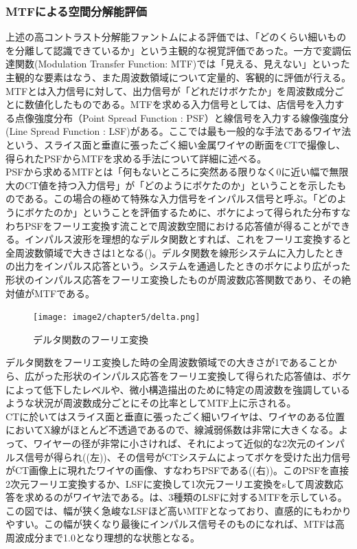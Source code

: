 \subsubsection*{MTFによる空間分解能評価\label{sec:MTF}}
上述の高コントラスト分解能ファントムによる評価では、「どのくらい細いものを分離して認識できているか」という主観的な視覚評価であった。一方で変調伝達関数(Modulation Transfer Function: MTF)では「見える、見えない」といった主観的な要素はなう、また周波数領域について定量的、客観的に評価が行える。MTFとは入力信号に対して、出力信号が「どれだけボケたか」を周波数成分ごとに数値化したものである。MTFを求める入力信号としては、店信号を入力する点像強度分布（Point Spread Function : PSF）と線信号を入力する線像強度分(Line Spread Function : LSF)がある。ここでは最も一般的な手法であるワイヤ法という、スライス面と垂直に張ったごく細い金属ワイヤの断面をCTで撮像し、得られたPSFからMTFを求める手法について詳細に述べる。\\
PSFから求めるMTFとは「何もないところに突然ある限りなく0に近い幅で無限大のCT値を持つ入力信号」が「どのようにボケたのか」ということを示したものである。この場合の極めて特殊な入力信号をインパルス信号と呼ぶ。「どのようにボケたのか」ということを評価するために、ボケによって得られた分布すなわちPSFをフーリエ変換す流ことで周波数空間における応答値が得ることができる。インパルス波形を理想的なデルタ関数とすれば、これをフーリエ変換すると全周波数領域で大きさは1となる()。デルタ関数を線形システムに入力したときの出力をインパルス応答という。システムを通過したときのボケにより広がった形状のインパルス応答をフーリエ変換したものが周波数応答関数であり、その絶対値がMTFである。\\

\begin{figure}[H]
 \begin{center}
 \texttt{[image: image2/chapter5/delta.png]} 
 \end{center}
 \caption{デルタ関数のフーリエ変換}
 \label{fig:delta}
\end{figure}

デルタ関数をフーリエ変換した時の全周波数領域での大きさが1であることから、広がった形状のインパルス応答をフーリエ変換して得られた応答値は、ボケによって低下したレベルや、微小構造描出のために特定の周波数を強調しているような状況が周波数成分ごとにその比率としてMTF上に示される。\\
CTに於いてはスライス面と垂直に張ったごく細いワイヤは、ワイヤのある位置においてX線がほとんど不透過であるので、線減弱係数は非常に大きくなる。よって、ワイヤーの径が非常に小さければ、それによって近似的な2次元のインパルス信号が得られ((左))、その信号がCTシステムによってボケを受けた出力信号がCT画像上に現れたワイヤの画像、すなわちPSFである((右))。このPSFを直接2次元フーリエ変換するか、LSFに変換して1次元フーリエ変換をsして周波数応答を求めるのがワイヤ法である。は、3種類のLSFに対するMTFを示している。この図では、幅が狭く急峻なLSFほど高いMTFとなっており、直感的にもわかりやすい。この幅が狭くなり最後にインパルス信号そのものになれば、MTFは高周波成分まで1.0となり理想的な状態となる。

